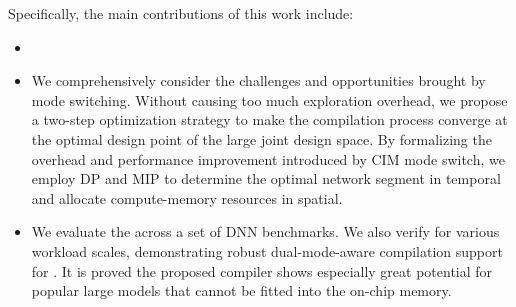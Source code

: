 
Specifically, the main contributions of this work include:
\begin{itemize}
    \item %
    \item We comprehensively consider the challenges and opportunities brought by mode switching. Without causing too much exploration overhead, we propose a two-step optimization strategy to make the compilation process converge at the optimal design point of the large joint design space. 
    By formalizing the overhead and performance improvement introduced by CIM mode switch, we employ DP and MIP to determine the optimal network segment in temporal and allocate compute-memory resources in spatial.
    \item We evaluate the \name across a set of DNN benchmarks.  We also verify \name for various workload scales, demonstrating robust dual-mode-aware compilation support for . It is proved the proposed compiler shows especially great potential for popular large models that cannot be fitted into the on-chip memory.
\end{itemize}




